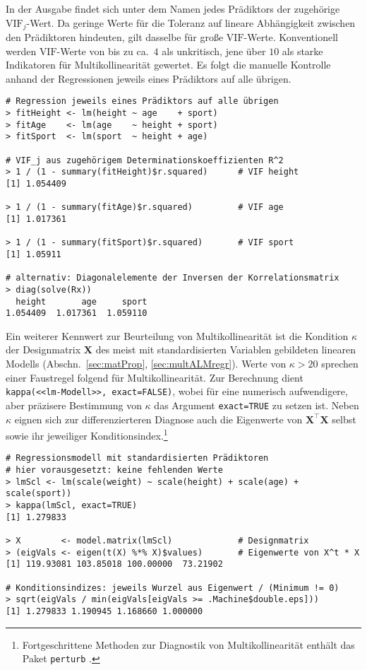 In der Ausgabe findet sich unter dem Namen jedes Prädiktors der zugehörige $\text{VIF}_{j}$-Wert. Da geringe Werte für die Toleranz auf lineare Abhängigkeit zwischen den Prädiktoren hindeuten, gilt dasselbe für große $\text{VIF}$-Werte. Konventionell werden $\text{VIF}$-Werte von bis zu ca.\ $4$ als unkritisch, jene über $10$ als starke Indikatoren für Multikollinearität gewertet. Es folgt die manuelle Kontrolle anhand der Regressionen jeweils eines Prädiktors auf alle übrigen.
\begin{lstlisting}
# Regression jeweils eines Prädiktors auf alle übrigen
> fitHeight <- lm(height ~ age    + sport)
> fitAge    <- lm(age    ~ height + sport)
> fitSport  <- lm(sport  ~ height + age)

# VIF_j aus zugehörigem Determinationskoeffizienten R^2
> 1 / (1 - summary(fitHeight)$r.squared)      # VIF height
[1] 1.054409

> 1 / (1 - summary(fitAge)$r.squared)         # VIF age
[1] 1.017361

> 1 / (1 - summary(fitSport)$r.squared)       # VIF sport
[1] 1.05911

# alternativ: Diagonalelemente der Inversen der Korrelationsmatrix
> diag(solve(Rx))
  height       age     sport
1.054409  1.017361  1.059110
\end{lstlisting}

Ein weiterer Kennwert zur Beurteilung von Multikollinearität ist die Kondition $\kappa$ der Designmatrix $\bm{X}$ des meist mit standardisierten Variablen gebildeten linearen Modells (Abschn.\ \ref{sec:matProp}, \ref{sec:multALMregr}). Werte von $\kappa > 20$ sprechen einer Faustregel folgend für Multikollinearität. Zur Berechnung dient \lstinline!kappa(<<lm-Modell>>, exact=FALSE)!, wobei für eine numerisch aufwendigere, aber präzisere Bestimmung von $\kappa$ das Argument \lstinline!exact=TRUE! zu setzen ist. Neben $\kappa$ eignen sich zur differenzierteren Diagnose auch die Eigenwerte von $\bm{X}^{\top} \bm{X}$ selbst sowie ihr jeweiliger Konditionsindex.\footnote{Fortgeschrittene Methoden zur Diagnostik von Multikollinearität enthält das Paket \lstinline!perturb! \cite{Hendrickx2008}.}
\begin{lstlisting}
# Regressionsmodell mit standardisierten Prädiktoren
# hier vorausgesetzt: keine fehlenden Werte
> lmScl <- lm(scale(weight) ~ scale(height) + scale(age) + scale(sport))
> kappa(lmScl, exact=TRUE)
[1] 1.279833

> X        <- model.matrix(lmScl)             # Designmatrix
> (eigVals <- eigen(t(X) %*% X)$values)       # Eigenwerte von X^t * X
[1] 119.93081 103.85018 100.00000  73.21902

# Konditionsindizes: jeweils Wurzel aus Eigenwert / (Minimum != 0)
> sqrt(eigVals / min(eigVals[eigVals >= .Machine$double.eps]))
[1] 1.279833 1.190945 1.168660 1.000000
\end{lstlisting}

